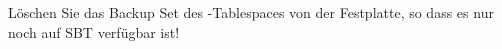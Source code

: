     \item Löschen Sie das Backup Set des -Tablespaces von der Festplatte, so dass es nur noch auf SBT verfügbar ist!
